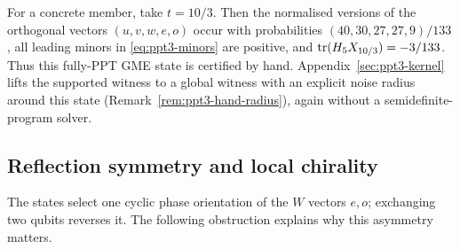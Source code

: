 For a concrete member, take $t=10/3$. Then the normalised versions of the orthogonal vectors
$(u,v,w,e,o)$ occur with probabilities
$(40,30,27,27,9)/133$, all leading minors in
\eqref{eq:ppt3-minors} are positive, and
$\operatorname{tr}(H_5X_{10/3})=-3/133$. Thus this fully-PPT GME state is certified by hand.
Appendix~\ref{sec:ppt3-kernel} lifts the supported witness to a global witness with an explicit noise radius around
this state (Remark~\ref{rem:ppt3-hand-radius}), again without a semidefinite-program solver.

\subsection{Reflection symmetry and local chirality}\label{sec:ppt3-chirality}

The states select one cyclic phase orientation of the $W$ vectors $e,o$; exchanging two qubits reverses it.
The following obstruction explains why this asymmetry matters.

